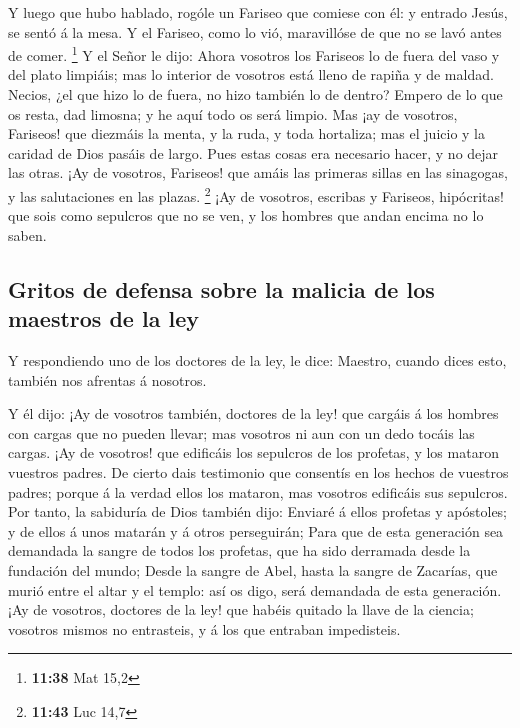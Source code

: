  Y luego que hubo hablado, rogóle un Fariseo que comiese
con él: y entrado Jesús, se sentó á la mesa.  Y el
Fariseo, como lo vió, maravillóse de que no se lavó antes de comer.
\footnote{\textbf{11:38} Mat 15,2}  Y el Señor le dijo:
Ahora vosotros los Fariseos lo de fuera del vaso y del plato limpiáis;
mas lo interior de vosotros está lleno de rapiña y de maldad.
 Necios, ¿el que hizo lo de fuera, no hizo también lo de
dentro?  Empero de lo que os resta, dad limosna; y he
aquí todo os será limpio.  Mas ¡ay de vosotros, Fariseos!
que diezmáis la menta, y la ruda, y toda hortaliza; mas el juicio y la
caridad de Dios pasáis de largo. Pues estas cosas era necesario hacer, y
no dejar las otras.  ¡Ay de vosotros, Fariseos! que amáis
las primeras sillas en las sinagogas, y las salutaciones en las plazas.
\footnote{\textbf{11:43} Luc 14,7}  ¡Ay de vosotros,
escribas y Fariseos, hipócritas! que sois como sepulcros que no se ven,
y los hombres que andan encima no lo saben.

\hypertarget{gritos-de-defensa-sobre-la-malicia-de-los-maestros-de-la-ley}{%
\subsection{Gritos de defensa sobre la malicia de los maestros de la
ley}\label{gritos-de-defensa-sobre-la-malicia-de-los-maestros-de-la-ley}}

 Y respondiendo uno de los doctores de la ley, le dice:
Maestro, cuando dices esto, también nos afrentas á nosotros.

 Y él dijo: ¡Ay de vosotros también, doctores de la ley!
que cargáis á los hombres con cargas que no pueden llevar; mas vosotros
ni aun con un dedo tocáis las cargas.  ¡Ay de vosotros!
que edificáis los sepulcros de los profetas, y los mataron vuestros
padres.  De cierto dais testimonio que consentís en los
hechos de vuestros padres; porque á la verdad ellos los mataron, mas
vosotros edificáis sus sepulcros.  Por tanto, la
sabiduría de Dios también dijo: Enviaré á ellos profetas y apóstoles; y
de ellos á unos matarán y á otros perseguirán;  Para que
de esta generación sea demandada la sangre de todos los profetas, que ha
sido derramada desde la fundación del mundo;  Desde la
sangre de Abel, hasta la sangre de Zacarías, que murió entre el altar y
el templo: así os digo, será demandada de esta generación.
 ¡Ay de vosotros, doctores de la ley! que habéis quitado
la llave de la ciencia; vosotros mismos no entrasteis, y á los que
entraban impedisteis.

